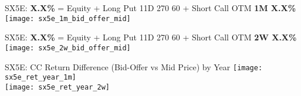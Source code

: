 \documentclass{beamer}
\begin{document}
\begin{frame}{\small SX5E: {\bf X.X\%} = Equity + Long Put 11D 270 60 + Short Call OTM {\bf 1M X.X\%}}
\texttt{[image: sx5e\_1m\_bid\_offer\_mid]}
\end{frame}
\begin{frame}{\small SX5E: {\bf X.X\%} = Equity + Long Put 11D 270 60 + Short Call OTM {\bf 2W X.X\%}}
\texttt{[image: sx5e\_2w\_bid\_offer\_mid]}
\end{frame}

\begin{frame}{\normalsize SX5E: CC Return Difference (Bid-Offer vs Mid Price) by Year}
\texttt{[image: sx5e\_ret\_year\_1m]} \\
\texttt{[image: sx5e\_ret\_year\_2w]}
\end{frame}
\end{document}
